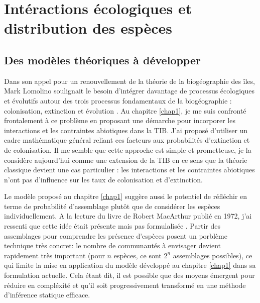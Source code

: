 \section*{Intéractions écologiques et distribution des
espèces}\label{intuxe9ractions-uxe9cologiques-et-distribution-des-espuxe8ces}

\subsection*{Des modèles théoriques à
développer}\label{des-moduxe8les-thuxe9oriques-uxe0-duxe9velopper}

Dans son appel pour un renouvellement de la théorie de la biogéographie
des îles, Mark Lomolino soulignait le besoin d'intégrer davantage de
processus écologiques et évolutifs autour des trois processus
fondamentaux de la biogéographie : colonisation, extinction et évolution
\citep{Lomolino2000}. Au chapitre \ref{chap1}, je me suis confronté
frontalement à ce problème en proposant une démarche pour incorporer les
interactions et les contraintes abiotiques dans la TIB. J'ai proposé
d'utiliser un cadre mathématique général reliant ces facteurs aux
probabilités d'extinction et de colonisation. Il me semble que cette
approche est simple et prometteuse, je la considère aujourd'hui comme
une extension de la TIB en ce sens que la théorie classique devient une
cas particulier : les interactions et les contraintes abiotiques n'ont
pas d'influence sur les taux de colonisation et d'extinction.

Le modèle proposé au chapitre \ref{chap1} suggère aussi le potentiel de
réfléchir en terme de probabilité d'assemblage \citep{Cazelles2015a}
plutôt que de considérer les espèces individuellement. A la lecture du
livre de Robert MacArthur publié en 1972, j'ai ressenti que cette idée
était présente mais pas formulalisée \citep{macarthur1972geographical}.
Partir des assemblages pour comprendre les présence d'espèces posent un
porblème technique très concret: le nombre de communautés à envisager
devient rapidement très important (pour \(n\) espèces, ce sont \(2^n\)
assemblages possibles), ce qui limite la mise en application du modèle
développé au chapitre \ref{chap1} dans sa formulation actuelle. Cela
étant dit, il est possible que des moyens émergent pour réduire en
compléxité et qu'il soit progressivement transformé en une méthode
d'inférence statique efficace.

